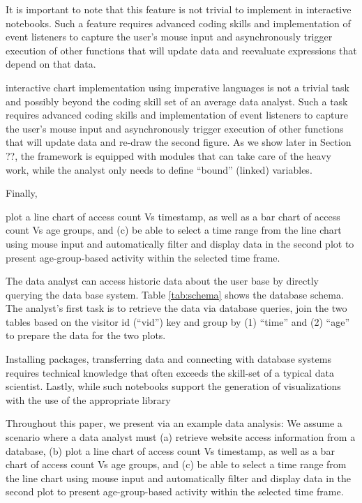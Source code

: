 It is important to note that this feature is not trivial to implement in interactive notebooks. Such a feature requires advanced coding skills and implementation of event listeners to capture the user's mouse input and asynchronously trigger execution of other functions that will update data and reevaluate expressions that depend on that data. 

interactive chart implementation using imperative languages is not a trivial task and possibly beyond the coding skill set of an average data analyst. Such a task requires advanced coding skills and implementation of event listeners to capture the user's mouse input and asynchronously trigger execution of other functions that will update data and re-draw the second figure. As we show later in Section ??, the {\projname} framework is equipped with modules that can take care of the heavy work, while the analyst only needs to define ``bound'' (linked) variables.


Finally, 


plot a line chart of access count Vs timestamp, as well as a bar chart of access count Vs age groups, and (c) be able to select a time range from the line chart using mouse input and automatically filter and display data in the second plot to present age-group-based activity within the selected time frame. 


The data analyst can access historic data about the user base by directly querying the data base system. Table \ref{tab:schema} shows the database schema. The analyst's first task is to retrieve the data via database queries, join the two tables based on the visitor id (``vid'') key and group by (1) ``time'' and (2) ``age'' to prepare the data for the two plots.

Installing packages, transferring data and connecting with database systems requires technical knowledge that often exceeds the skill-set of a typical data scientist. Lastly, while such notebooks support the generation of visualizations with the use of the appropriate library



Throughout this paper, we present {\projname} via an example data analysis: We assume a scenario where a data analyst must (a) retrieve  website access information from a database, (b) plot a line chart of access count Vs timestamp, as well as a bar chart of access count Vs age groups, and (c) be able to select a time range from the line chart using mouse input and automatically filter and display data in the second plot to present age-group-based activity within the selected time frame. 

